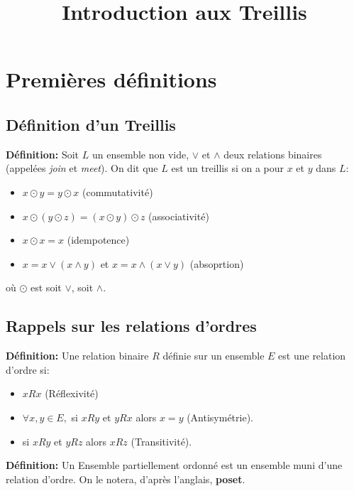\documentclass[a4paper, 11pt]{article}
\title{Introduction aux Treillis}
\begin{document}
\maketitle

\section{Premières définitions}

\subsection{Définition d'un Treillis}

\begin{tcolorbox} 
	\textbf{Définition:} Soit $L$ un ensemble non vide, $\lor$ et $\land$ deux relations binaires (appelées \textit{join} et \textit{meet}). On dit que $L$ est un treillis si on a pour $x$ et $y$ dans $L$:
	\begin{itemize} 
		\item $x \odot y = y \odot x$ (commutativité)
		\item $x \odot (y \odot z) = (x \odot y) \odot z$ (associativité)
		\item $x \odot x = x$ (idempotence)
		\item $x = x \lor (x \land y)$ et $x = x \land (x \lor y)$ (absoprtion)
	\end{itemize}

	où $\odot$ est soit $\lor$, soit $\land$.
\end{tcolorbox}

\subsection{Rappels sur les relations d'ordres}

\begin{tcolorbox} 
	\textbf{Définition:} Une relation binaire $R$ définie sur un ensemble $E$ est une relation d'ordre si: 
	\begin{itemize} 
		\item $xRx$ (Réflexivité)
		\item $\forall x,y \in E,$ si $xRy$ et $yRx$ alors $x=y$ (Antisymétrie).
		\item si $xRy$ et $yRz$ alors $xRz$ (Transitivité).
	\end{itemize}
\end{tcolorbox}

\begin{tcolorbox} 
	\textbf{Définition:} Un Ensemble partiellement ordonné est un ensemble muni d'une relation d'ordre. On le notera, d'après l'anglais, \textbf{poset}.
\end{tcolorbox}
\end{document}
